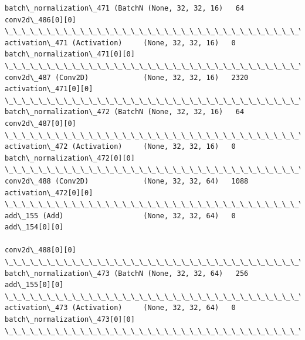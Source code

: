 \documentclass[11pt]{article}
\begin{document}
\begin{Verbatim}[commandchars=\\\{\}]
batch\_normalization\_471 (BatchN (None, 32, 32, 16)   64          conv2d\_486[0][0]                 
\_\_\_\_\_\_\_\_\_\_\_\_\_\_\_\_\_\_\_\_\_\_\_\_\_\_\_\_\_\_\_\_\_\_\_\_\_\_\_\_\_\_\_\_\_\_\_\_\_\_\_\_\_\_\_\_\_\_\_\_\_\_\_\_\_\_\_\_\_\_\_\_\_\_\_\_\_\_\_\_\_\_\_\_\_\_\_\_\_\_\_\_\_\_\_\_\_\_
activation\_471 (Activation)     (None, 32, 32, 16)   0           batch\_normalization\_471[0][0]    
\_\_\_\_\_\_\_\_\_\_\_\_\_\_\_\_\_\_\_\_\_\_\_\_\_\_\_\_\_\_\_\_\_\_\_\_\_\_\_\_\_\_\_\_\_\_\_\_\_\_\_\_\_\_\_\_\_\_\_\_\_\_\_\_\_\_\_\_\_\_\_\_\_\_\_\_\_\_\_\_\_\_\_\_\_\_\_\_\_\_\_\_\_\_\_\_\_\_
conv2d\_487 (Conv2D)             (None, 32, 32, 16)   2320        activation\_471[0][0]             
\_\_\_\_\_\_\_\_\_\_\_\_\_\_\_\_\_\_\_\_\_\_\_\_\_\_\_\_\_\_\_\_\_\_\_\_\_\_\_\_\_\_\_\_\_\_\_\_\_\_\_\_\_\_\_\_\_\_\_\_\_\_\_\_\_\_\_\_\_\_\_\_\_\_\_\_\_\_\_\_\_\_\_\_\_\_\_\_\_\_\_\_\_\_\_\_\_\_
batch\_normalization\_472 (BatchN (None, 32, 32, 16)   64          conv2d\_487[0][0]                 
\_\_\_\_\_\_\_\_\_\_\_\_\_\_\_\_\_\_\_\_\_\_\_\_\_\_\_\_\_\_\_\_\_\_\_\_\_\_\_\_\_\_\_\_\_\_\_\_\_\_\_\_\_\_\_\_\_\_\_\_\_\_\_\_\_\_\_\_\_\_\_\_\_\_\_\_\_\_\_\_\_\_\_\_\_\_\_\_\_\_\_\_\_\_\_\_\_\_
activation\_472 (Activation)     (None, 32, 32, 16)   0           batch\_normalization\_472[0][0]    
\_\_\_\_\_\_\_\_\_\_\_\_\_\_\_\_\_\_\_\_\_\_\_\_\_\_\_\_\_\_\_\_\_\_\_\_\_\_\_\_\_\_\_\_\_\_\_\_\_\_\_\_\_\_\_\_\_\_\_\_\_\_\_\_\_\_\_\_\_\_\_\_\_\_\_\_\_\_\_\_\_\_\_\_\_\_\_\_\_\_\_\_\_\_\_\_\_\_
conv2d\_488 (Conv2D)             (None, 32, 32, 64)   1088        activation\_472[0][0]             
\_\_\_\_\_\_\_\_\_\_\_\_\_\_\_\_\_\_\_\_\_\_\_\_\_\_\_\_\_\_\_\_\_\_\_\_\_\_\_\_\_\_\_\_\_\_\_\_\_\_\_\_\_\_\_\_\_\_\_\_\_\_\_\_\_\_\_\_\_\_\_\_\_\_\_\_\_\_\_\_\_\_\_\_\_\_\_\_\_\_\_\_\_\_\_\_\_\_
add\_155 (Add)                   (None, 32, 32, 64)   0           add\_154[0][0]                    
                                                                 conv2d\_488[0][0]                 
\_\_\_\_\_\_\_\_\_\_\_\_\_\_\_\_\_\_\_\_\_\_\_\_\_\_\_\_\_\_\_\_\_\_\_\_\_\_\_\_\_\_\_\_\_\_\_\_\_\_\_\_\_\_\_\_\_\_\_\_\_\_\_\_\_\_\_\_\_\_\_\_\_\_\_\_\_\_\_\_\_\_\_\_\_\_\_\_\_\_\_\_\_\_\_\_\_\_
batch\_normalization\_473 (BatchN (None, 32, 32, 64)   256         add\_155[0][0]                    
\_\_\_\_\_\_\_\_\_\_\_\_\_\_\_\_\_\_\_\_\_\_\_\_\_\_\_\_\_\_\_\_\_\_\_\_\_\_\_\_\_\_\_\_\_\_\_\_\_\_\_\_\_\_\_\_\_\_\_\_\_\_\_\_\_\_\_\_\_\_\_\_\_\_\_\_\_\_\_\_\_\_\_\_\_\_\_\_\_\_\_\_\_\_\_\_\_\_
activation\_473 (Activation)     (None, 32, 32, 64)   0           batch\_normalization\_473[0][0]    
\_\_\_\_\_\_\_\_\_\_\_\_\_\_\_\_\_\_\_\_\_\_\_\_\_\_\_\_\_\_\_\_\_\_\_\_\_\_\_\_\_\_\_\_\_\_\_\_\_\_\_\_\_\_\_\_\_\_\_\_\_\_\_\_\_\_\_\_\_\_\_\_\_\_\_\_\_\_\_\_\_\_\_\_\_\_\_\_\_\_\_\_\_\_\_\_\_\_

\end{Verbatim}
\end{document}
